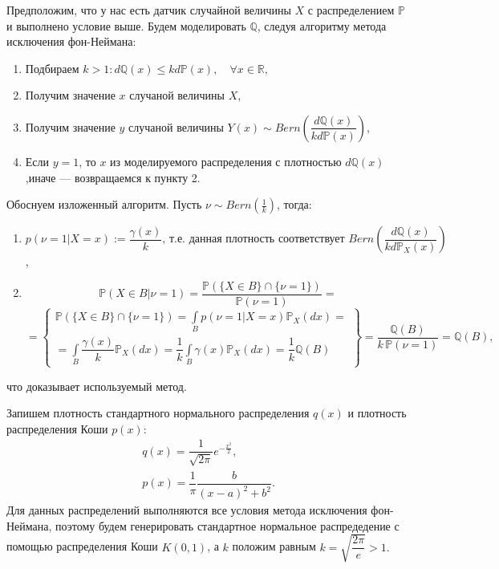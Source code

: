 \documentclass[oneside, final, 12pt]{article}
\def\P{{\mathbb{P} }}
\def\Q{{\mathbb{Q} }}
\begin{document}
	Предположим, что у нас есть датчик случайной величины $X$  с распределением $\P$ и выполнено
	условие выше.	Будем моделировать $\Q$, следуя алгоритму метода исключения фон-Неймана:
	\begin{enumerate}
		\item Подбираем $k>1: d\Q(x)\leqslant kd\P(x), \quad \forall x \in \mathbb{R},$
		\item Получим значение $x$ случаной величины $X$,
		\item Получим значение $y$ случаной величины
				 $Y(x) \sim Bern\left( \dfrac{d\Q(x)}{kd\P(x)} \right)$,
		\item Если $y=1$, то $x$ из моделируемого распределения с плотностью 
				$d\Q(x)$,\newline иначе --- возвращаемся к пункту 2.
	\end{enumerate}
	\newpage
	Обоснуем изложенный алгоритм. Пусть $\nu\sim Bern\left(\frac{1}{k}\right)$, тогда:
	\begin{enumerate}
			\item $p(\nu =1|X =x ):= \dfrac{\gamma(x)}{k} \text{, т.е. данная плотность соответствует }
											 Bern\left( \dfrac{d\Q(x)}{kd\P_X(x)} \right) $,
			\item 	$$ 
							\P(X \in B| \nu = 1) =\dfrac{\P(\{X\in B\} \cap \{\nu=1 \})}{\P(\nu=1 )} =
						$$
						$$
							= \left\{ \begin{gathered}
							 	 \P(\{X\in B\} \cap \{\nu=1 \})= 
								\int\limits_B p(\nu=1|X=x) \P_X(dx) =\\
								= \int\limits_B \dfrac{\gamma(x)}{k}  \P_X(dx)
								= \dfrac{1}{k}\int\limits_B \gamma(x) \P_X(dx) =
								\dfrac{1}{k} \Q(B) 					
							\end{gathered}	\right\}	= \dfrac{\Q(B)}{k\,\P(\nu=1)} = \Q(B),
						$$			
	\end{enumerate}
	что доказывает используемый метод.

	Запишем плотность стандартного нормального распределения $q(x)$ и плотность
	распределения Коши $p(x)$:
	$$
		\begin{gathered}
			q(x) = \dfrac{1}{\sqrt{2\pi}}e^{-\frac{x^2}{2}}, \\
			p(x) = \dfrac{1}{\pi}\dfrac{b}{(x-a)^2+b^2}.
		\end{gathered}
	$$
	Для данных распределений выполняются все условия метода исключения фон-Неймана, 
	поэтому будем генерировать 
	стандартное нормальное распредедение с помощью распределения Коши $K(0,1)$, 
	а $k$ положим равным $k =\sqrt{\dfrac{2\pi}{e}} >1.$
	
\end{document}
